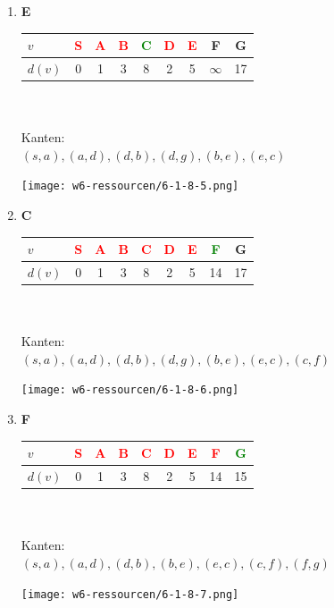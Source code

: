 \documentclass{article}
\begin{document}
\begin{enumerate}
	\item \textbf{E}\\
	\begin{minipage}[t]{0.48\textwidth}
		\begin{tabular}{l||c|c|c|c|c|c|c|c}
			$v$		&	\textcolor{red}{S}	&	\textcolor{red}{A}	&	\textcolor{red}{B}	&	\textcolor{green}{C}	&	\textcolor{red}{D}	&	\textcolor{red}{E}	&	F	&	G	\\	\hline
			$d(v)$	&	0	&	1	&	3	&	8	&	2	&	5	&	$\infty$	&	17
		\end{tabular}\\\\
		Kanten:\\
		$(s,a),(a,d),(d,b),(d,g),(b,e),(e,c)$
	\end{minipage}
	\begin{minipage}[t]{0.48\textwidth}
		\texttt{[image: w6-ressourcen/6-1-8-5.png]}
	\end{minipage}
	
	\item \textbf{C}\\
	\begin{minipage}[t]{0.48\textwidth}
		\begin{tabular}{l||c|c|c|c|c|c|c|c}
			$v$		&	\textcolor{red}{S}	&	\textcolor{red}{A}	&	\textcolor{red}{B}	&	\textcolor{red}{C}	&	\textcolor{red}{D}	&	\textcolor{red}{E}	&	\textcolor{green}{F}	&	G	\\	\hline
			$d(v)$	&	0	&	1	&	3	&	8	&	2	&	5	&	14	&	17
		\end{tabular}\\\\
		Kanten:\\
		$(s,a),(a,d),(d,b),(d,g),(b,e),(e,c),(c,f)$
	\end{minipage}
	\begin{minipage}[t]{0.48\textwidth}
		\texttt{[image: w6-ressourcen/6-1-8-6.png]}
	\end{minipage}
	
	\item \textbf{F}\\
	\begin{minipage}[t]{0.48\textwidth}
		\begin{tabular}{l||c|c|c|c|c|c|c|c}
			$v$		&	\textcolor{red}{S}	&	\textcolor{red}{A}	&	\textcolor{red}{B}	&	\textcolor{red}{C}	&	\textcolor{red}{D}	&	\textcolor{red}{E}	&	\textcolor{red}{F}	&	\textcolor{green}{G}	\\	\hline
			$d(v)$	&	0	&	1	&	3	&	8	&	2	&	5	&	14	&	15
		\end{tabular}\\\\
		Kanten:\\
		$(s,a),(a,d),(d,b),(b,e),(e,c),(c,f),(f,g)$
	\end{minipage}
	\begin{minipage}[t]{0.48\textwidth}
		\texttt{[image: w6-ressourcen/6-1-8-7.png]}
	\end{minipage}
	

\end{enumerate}
\end{document}
